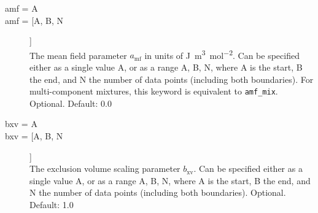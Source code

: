 \documentclass{scrartcl}
\newcommand{\amf}{a_\mathrm{mf}}
\newcommand{\bxv}{b_\mathrm{xv}}
\begin{document}
\begin{description}
    \item[amf = A]
    \item[amf = [A, B, N]] \hfill \\
        The mean field parameter $\amf$ in units of \si{\joule\cubic\meter\per\mole\squared}.
        Can be specified either as a single value A, or as a range A, B, N, where A is the start, B the end, 
        and N the number of data points (including both boundaries).
        For multi-component mixtures, this keyword is equivalent to \texttt{amf\_mix}.
        Optional. Default: 0.0
        \vspace{0.1cm}
    \item[bxv = A]
    \item[bxv = [A, B, N]] \hfill \\
        The exclusion volume scaling parameter $\bxv$.
        Can be specified either as a single value A, or as a range A, B, N, where A is the start, B the end, 
        and N the number of data points (including both boundaries).
        Optional. Default: 1.0
        \vspace{0.1cm}

\end{description}
\end{document}
